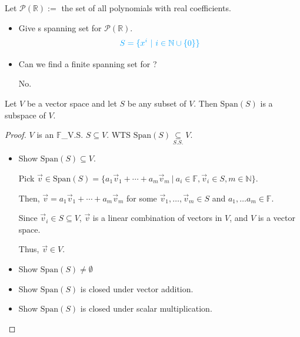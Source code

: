 \documentclass[11pt,fleqn]{book} %
\begin{document}
\begin{example}
    Let $\mathcal{P}(\mathbb{R}):=$ the set of all polynomials with real coefficients.

    \begin{itemize}
        \item Give s spanning set for $\mathcal{P}(\mathbb{R})$.
        $$\color{lightblue} S = \{ x^i ~|~ i \in \mathbb{N} \cup \{0\} \} $$

        \vspace{-0.5cm}
        \item Can we find a finite spanning set for ?

        {\color{lightblue} No. }
    \end{itemize}
\end{example}

\setcounter{dummy}{3}
\begin{theorem}
    Let $V$ be a vector space and let $S$ be any subset of $V$. Then $\mathrm{Span}(S)$ is a subspace of $V$.
\end{theorem}

\begin{proof}
    $V$ is an $\mathbb{F}$\_V.S. $S \subseteq V$. WTS $\mathrm{Span}(S) \underset{S.S.}{\subseteq} V$.

    \begin{itemize}
        \item Show $\mathrm{Span}(S) \subseteq V$.

        Pick $\vec{v} \in \mathrm{Span}\left( S \right) = \{ a_1\vec{v}_1 + \cdots + a_m\vec{v}_m ~|~ a_i \in \mathbb{F}, \vec{v}_i \in S, m \in \mathbb{N} \}$.

        Then, $\vec{v} = a_1\vec{v}_1 + \cdots + a_m\vec{v}_m$ for some $\vec{v}_1, \dots, \vec{v}_m \in S$ and $a_1,\dots a_m  \in \mathbb{F}$.

        Since $\vec{v}_i \in S \subseteq V$, $\vec{v}$ is a linear combination of vectors in $V$, and $V$ is a vector space.

        Thus, $\vec{v} \in V$.

        \item Show $\mathrm{Span}(S) \neq \emptyset$

        \item Show $\mathrm{Span}(S)$ is closed under vector addition.

        \item Show $\mathrm{Span}(S)$ is closed under scalar multiplication.
    \end{itemize}
\end{proof}
\end{document}
